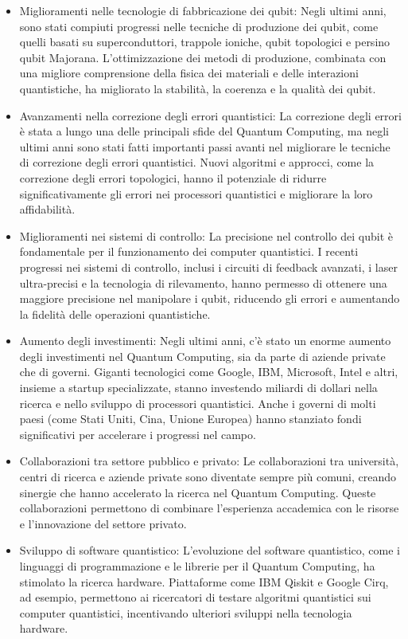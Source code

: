 \documentclass[a4paper,12pt]{report}
\theoremstyle{plain}
\begin{document}
\begin{itemize}
  \item Miglioramenti nelle tecnologie di fabbricazione dei qubit: Negli ultimi anni, sono stati compiuti progressi nelle tecniche di produzione dei qubit, come quelli basati su superconduttori, trappole ioniche, qubit topologici e persino qubit Majorana. L'ottimizzazione dei metodi di produzione, combinata con una migliore comprensione della fisica dei materiali e delle interazioni quantistiche, ha migliorato la stabilità, la coerenza e la qualità dei qubit.
  \item Avanzamenti nella correzione degli errori quantistici: La correzione degli errori è stata a lungo una delle principali sfide del Quantum Computing, ma negli ultimi anni sono stati fatti importanti passi avanti nel migliorare le tecniche di correzione degli errori quantistici. Nuovi algoritmi e approcci, come la correzione degli errori topologici, hanno il potenziale di ridurre significativamente gli errori nei processori quantistici e migliorare la loro affidabilità.
  \item Miglioramenti nei sistemi di controllo: La precisione nel controllo dei qubit è fondamentale per il funzionamento dei computer quantistici. I recenti progressi nei sistemi di controllo, inclusi i circuiti di feedback avanzati, i laser ultra-precisi e la tecnologia di rilevamento, hanno permesso di ottenere una maggiore precisione nel manipolare i qubit, riducendo gli errori e aumentando la fidelità delle operazioni quantistiche.
  \item Aumento degli investimenti: Negli ultimi anni, c'è stato un enorme aumento degli investimenti nel Quantum Computing, sia da parte di aziende private che di governi. Giganti tecnologici come Google, IBM, Microsoft, Intel e altri, insieme a startup specializzate, stanno investendo miliardi di dollari nella ricerca e nello sviluppo di processori quantistici. Anche i governi di molti paesi (come Stati Uniti, Cina, Unione Europea) hanno stanziato fondi significativi per accelerare i progressi nel campo.
  \item Collaborazioni tra settore pubblico e privato: Le collaborazioni tra università, centri di ricerca e aziende private sono diventate sempre più comuni, creando sinergie che hanno accelerato la ricerca nel Quantum Computing. Queste collaborazioni permettono di combinare l'esperienza accademica con le risorse e l'innovazione del settore privato.
  \item Sviluppo di software quantistico: L'evoluzione del software quantistico, come i linguaggi di programmazione e le librerie per il Quantum Computing, ha stimolato la ricerca hardware. Piattaforme come IBM Qiskit e Google Cirq, ad esempio, permettono ai ricercatori di testare algoritmi quantistici sui computer quantistici, incentivando ulteriori sviluppi nella tecnologia hardware.

\end{itemize}
\end{document}
